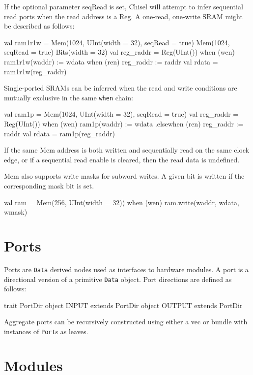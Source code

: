 \documentclass[10pt,twocolumn]{article}
\def\code#1{{\small\tt #1}}
\begin{document}
If the optional parameter seqRead is set, Chisel will attempt to infer
sequential read ports when the read address is a Reg.  A one-read,
one-write SRAM might be described as follows:

\begin{scala}
val ram1r1w =
  Mem(1024, UInt(width = 32), seqRead = true)
  Mem(1024, seqRead = true) { Bits(width = 32) }
val reg_raddr = Reg(UInt())
when (wen) { ram1r1w(waddr) := wdata }
when (ren) { reg_raddr := raddr }
val rdata = ram1r1w(reg_raddr)
\end{scala}

Single-ported SRAMs can be inferred when the read and write conditions are
mutually exclusive in the same \code{when} chain:

\begin{scala}
val ram1p = 
  Mem(1024, UInt(width = 32), seqRead = true)
val reg_raddr = Reg(UInt())
when (wen) { ram1p(waddr) := wdata }
.elsewhen (ren) { reg_raddr := raddr }
val rdata = ram1p(reg_raddr)
\end{scala}

If the same Mem address is both written and sequentially read on the same clock
edge, or if a sequential read enable is cleared, then the read data is
undefined.

Mem also supports write masks for subword writes.  A given bit is written if
the corresponding mask bit is set.

\begin{scala}
val ram = Mem(256, UInt(width = 32))
when (wen) { ram.write(waddr, wdata, wmask) }
\end{scala}

\section{Ports}
\label{sec:ports}

Ports are \code{Data} derived nodes used as interfaces to hardware
modules.   A port is a directional version of a primitive
\code{Data} object.  Port directions are defined as follows:

\begin{scala}
trait PortDir
object INPUT  extends PortDir
object OUTPUT extends PortDir
\end{scala}

\noindent
Aggregate ports can be recursively constructed using either a vec or
bundle with instances of \code{Port}s as leaves.  

\section{Modules}
\end{document}
